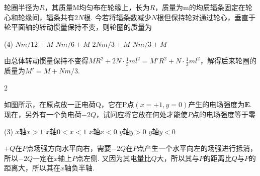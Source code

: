 \begin{problem}
    轮圈半径为$R$，其质量M均匀布在轮缘上，长为$R$，质量为m的均质辐条固定在轮心和轮缘间，辐条共有$2N$根. 今若将辐条数减少$N$根但保持轮对通过轮心，垂直于轮平面轴的转动惯量保持不变，则轮圈的质量为
    \begin{tasks}(4)
        \task $Nm/12+M$
        \task $Nm/6+M$
        \task $2Nm/3+M$
        \task[\true] $Nm/3+M$
    \end{tasks}
\end{problem}
\begin{solution}
    由总体转动惯量保持不变得$MR^2+2N\cdot\frac{1}{3}ml^2=M'R^2+N\cdot\frac{1}{3}ml^2$，解得后来轮圈的质量为$M'=M+Nm/3$.
\end{solution}

\begin{paracol}{2}
\begin{problem}
    如图所示，在原点放一正电荷Q，它在P点$(x=+1,y=0)$产生的电场强度为$\bm E$. 现在，另外有一个负电荷$-2Q$，试问应将它放在何处才能使$P$点的电场强度等于零
    \begin{tasks}(3)
        \task $x$轴$x>1$
        \task $x$轴$0<x<1$
        \task[\true] $x$轴$x<0$
        \task $y$轴$y>0$
        \task $y$轴$y<0$
    \end{tasks}
    \switchcolumn\vspace*{\fill}\centering
    \vspace*{\fill}
\end{problem}
\end{paracol}
\begin{solution}
    $+Q$在$P$点场强方向水平向右，需要$-2Q$在$P$点产生一个水平向左的场强进行抵消，所以$-2Q$一定在$x$轴上$P$点左侧. 又因为其电量比$Q$大，所以其与$P$的距离比$Q$与$P$的距离大，所以其在$x$轴负半轴.
\end{solution}

